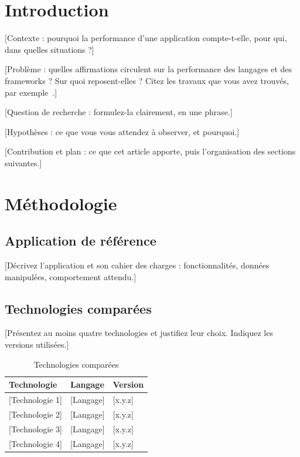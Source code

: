 \documentclass[conference,a4paper]{IEEEtran}
\begin{document}
\section{Introduction}
[Contexte : pourquoi la performance d'une application compte-t-elle,
pour qui, dans quelles situations ?]

[Problème : quelles affirmations circulent sur la performance des
langages et des frameworks ? Sur quoi reposent-elles ? Citez les
travaux que vous avez trouvés, par exemple~\cite{ref1}.]

[Question de recherche : formulez-la clairement, en une phrase.]

[Hypothèses : ce que vous vous attendez à observer, et pourquoi.]

[Contribution et plan : ce que cet article apporte, puis l'organisation
des sections suivantes.]

\section{Méthodologie}
\subsection{Application de référence}
[Décrivez l'application et son cahier des charges : fonctionnalités,
données manipulées, comportement attendu.]

\subsection{Technologies comparées}
[Présentez au moins quatre technologies et justifiez leur choix.
Indiquez les versions utilisées.]

\begin{table}[htbp]
\caption{Technologies comparées}
\label{tab:techno}
\centering
\begin{tabular}{@{}lll@{}}
\toprule
\textbf{Technologie} & \textbf{Langage} & \textbf{Version} \\
\midrule
{[Technologie 1]} & [Langage] & [x.y.z] \\
{[Technologie 2]} & [Langage] & [x.y.z] \\
{[Technologie 3]} & [Langage] & [x.y.z] \\
{[Technologie 4]} & [Langage] & [x.y.z] \\
\bottomrule
\end{tabular}
\end{table}
\end{document}

